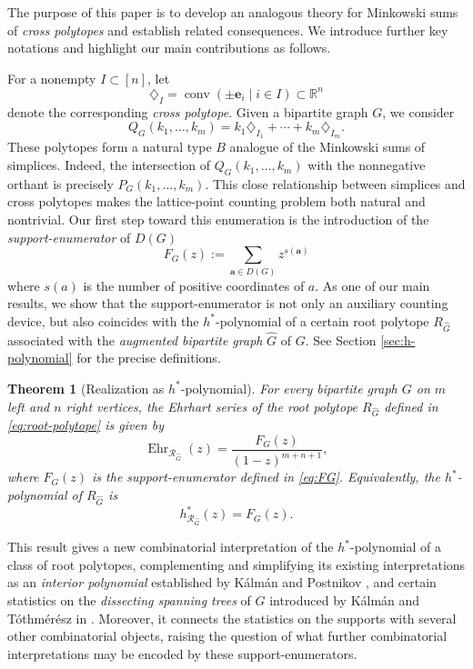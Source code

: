 \documentclass[11pt,a4paper]{article}
\newcommand{\vct}[1]{\boldsymbol{#1}}
\newcommand{\R}{\mathbb{R}}
\newcommand{\conv}{\operatorname{conv}}
\newcommand{\Ehr}{\operatorname{Ehr}}
\newcommand{\1}{\mathbf{1}}
\theoremstyle{plain}
\newtheorem{theorem}{Theorem}[section]
\theoremstyle{definition}
\begin{document}
The purpose of this paper is to develop an analogous theory for
Minkowski sums of \textit{cross polytopes} and establish related consequences. We introduce further key notations and highlight our main contributions as follows.

For a nonempty
$I\subset[n]$, let
\[
\diamondsuit_I=\conv(\pm\vct{e}_i\mid i\in I) \subset \R^n
\]
denote the corresponding \textit{cross polytope}. Given a bipartite graph
$G$, we consider
\begin{equation}\label{eq:cross-polytope}
   Q_G(k_1,\ldots,k_m)
=
k_1\diamondsuit_{I_1}+\cdots+k_m\diamondsuit_{I_m}. 
\end{equation}
These polytopes form a natural type $B$ analogue of the Minkowski sums
of simplices. Indeed, the intersection of
$Q_G(k_1,\ldots,k_m)$ with the nonnegative orthant is precisely $P_G(k_1,\dots, k_m).$ This close relationship between simplices and cross polytopes makes the lattice-point counting problem
both natural and nontrivial. Our first step toward this enumeration is the introduction of the
\emph{support-enumerator} of $D(G)$ 
\begin{equation}
F_G(z):=\sum_{\vct{a}\in D(G)}z^{s(\vct{a})}
\label{eq:FG}
\end{equation}
where $s(a)$ is
the number of positive coordinates of $a$. As one of our main results, we show that the support-enumerator is not only an auxiliary counting device, but also coincides with the $h^*$-polynomial of a certain root polytope $R_{\widehat G}$ associated with the \textit{augmented bipartite graph} $\widehat G$ of $G$. See Section \ref{sec:h-polynomial} for the precise definitions.
\begin{theorem}[Realization as $h^*$-polynomial]\label{thm:F_G-h-polynomial}
For every bipartite graph $G$ on $m$ left and $n$ right vertices, the Ehrhart series of the root polytope $R_{\widehat G}$ defined in \eqref{eq:root-polytope} is given by
\begin{equation}
\Ehr_{\mathcal R_{\widehat G}}(z)
=\frac{F_G(z)}{(1-z)^{m+n+1}},
\label{eq:root-ehrhart}
\end{equation}
where $F_{G}(z)$ is the support-enumerator defined in \eqref{eq:FG}.
Equivalently, the $h^*$-polynomial of $R_{\widehat G}$ is
\begin{equation}
h^*_{\mathcal R_{\widehat G}}(z)=F_G(z).
\label{eq:hstar-F}
\end{equation}
\end{theorem}
This result gives a new combinatorial interpretation of the
$h^*$-polynomial of a class of root polytopes, complementing and simplifying its existing interpretations as an \emph{interior polynomial} established by K\'alm\'an and
Postnikov \cite{KalmanPostnikov2017}, and certain statistics on the \textit{dissecting spanning trees} of $G$ introduced by K\'alm\'an and T\'othm\'er\'esz in \cite{KalmanTothmeresz2023}. Moreover, it connects the statistics on the supports with several other combinatorial objects, raising the question of what further combinatorial interpretations may be encoded by these support-enumerators.
\end{document}
